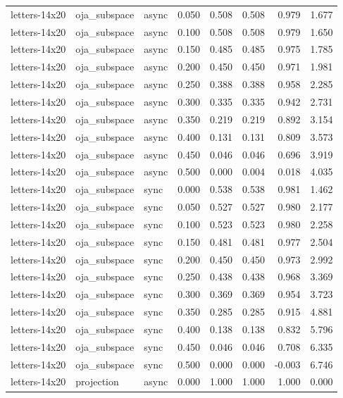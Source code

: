 \begin{tabular}{lllrrrrr}
letters-14x20 & oja\_subspace & async & 0.050 & 0.508 & 0.508 & 0.979 & 1.677 \\
letters-14x20 & oja\_subspace & async & 0.100 & 0.508 & 0.508 & 0.979 & 1.650 \\
letters-14x20 & oja\_subspace & async & 0.150 & 0.485 & 0.485 & 0.975 & 1.785 \\
letters-14x20 & oja\_subspace & async & 0.200 & 0.450 & 0.450 & 0.971 & 1.981 \\
letters-14x20 & oja\_subspace & async & 0.250 & 0.388 & 0.388 & 0.958 & 2.285 \\
letters-14x20 & oja\_subspace & async & 0.300 & 0.335 & 0.335 & 0.942 & 2.731 \\
letters-14x20 & oja\_subspace & async & 0.350 & 0.219 & 0.219 & 0.892 & 3.154 \\
letters-14x20 & oja\_subspace & async & 0.400 & 0.131 & 0.131 & 0.809 & 3.573 \\
letters-14x20 & oja\_subspace & async & 0.450 & 0.046 & 0.046 & 0.696 & 3.919 \\
letters-14x20 & oja\_subspace & async & 0.500 & 0.000 & 0.004 & 0.018 & 4.035 \\
letters-14x20 & oja\_subspace & sync & 0.000 & 0.538 & 0.538 & 0.981 & 1.462 \\
letters-14x20 & oja\_subspace & sync & 0.050 & 0.527 & 0.527 & 0.980 & 2.177 \\
letters-14x20 & oja\_subspace & sync & 0.100 & 0.523 & 0.523 & 0.980 & 2.258 \\
letters-14x20 & oja\_subspace & sync & 0.150 & 0.481 & 0.481 & 0.977 & 2.504 \\
letters-14x20 & oja\_subspace & sync & 0.200 & 0.450 & 0.450 & 0.973 & 2.992 \\
letters-14x20 & oja\_subspace & sync & 0.250 & 0.438 & 0.438 & 0.968 & 3.369 \\
letters-14x20 & oja\_subspace & sync & 0.300 & 0.369 & 0.369 & 0.954 & 3.723 \\
letters-14x20 & oja\_subspace & sync & 0.350 & 0.285 & 0.285 & 0.915 & 4.881 \\
letters-14x20 & oja\_subspace & sync & 0.400 & 0.138 & 0.138 & 0.832 & 5.796 \\
letters-14x20 & oja\_subspace & sync & 0.450 & 0.046 & 0.046 & 0.708 & 6.335 \\
letters-14x20 & oja\_subspace & sync & 0.500 & 0.000 & 0.000 & -0.003 & 6.746 \\
letters-14x20 & projection & async & 0.000 & 1.000 & 1.000 & 1.000 & 0.000 \\

\end{tabular}

